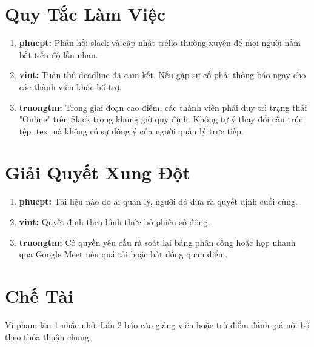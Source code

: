 \documentclass[12pt,a4paper]{article}
\begin{document}
\section{Quy Tắc Làm Việc}
\begin{enumerate}[itemsep=0pt, parsep=0pt] 
    \item \textbf{phucpt:} Phản hồi slack và cập nhật trello thường xuyên để mọi người nắm bắt tiến độ lẫn nhau.
    \item \textbf{vint:} Tuân thủ deadline đã cam kết. Nếu gặp sự cố phải thông báo ngay cho các thành viên khác hỗ trợ.
    \item \textbf{truongtm:} Trong giai đoạn cao điểm, các thành viên phải duy trì trạng thái "Online" trên Slack trong khung giờ quy định. Không tự ý thay đổi cấu trúc tệp .tex mà không có sự đồng ý của người quản lý trực tiếp.
\end{enumerate}

\section{Giải Quyết Xung Đột}
\begin{enumerate}[itemsep=0pt, parsep=0pt]
    \item \textbf{phucpt:} Tài liệu nào do ai quản lý, người đó đưa ra quyết định cuối cùng.
    \item \textbf{vint:} Quyết định theo hình thức bỏ phiếu số đông.
    \item \textbf{truongtm:} Có quyền yêu cầu rà soát lại bảng phân công hoặc họp nhanh qua Google Meet nếu quá tải hoặc bất đồng quan điểm.
\end{enumerate}

\section{Chế Tài}
Vi phạm lần 1 nhắc nhở. Lần 2 báo cáo giảng viên hoặc trừ điểm đánh giá nội bộ theo thỏa thuận chung.
\end{document}
